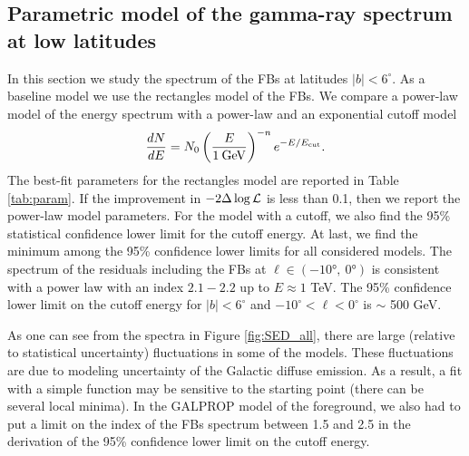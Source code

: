 \subsection{Parametric model of the gamma-ray spectrum at low latitudes}
\label{sec:param_model}

In this section we study the spectrum of the FBs at latitudes $|b| < 6^\circ$.
As a baseline model we use the rectangles model of the FBs.
We compare a power-law model of the energy spectrum with a power-law and an exponential cutoff model
\begin{equation}
\frac{dN}{dE} = N_0 \left( \frac{E}{1\:{\rm GeV}} \right)^{-n} e^{-E / E_{\rm cut}}.
\end{equation}
The best-fit parameters for the rectangles model are reported in Table \ref{tab:param}.
If the improvement in $-2 \Delta \log {\mathcal{L}}$ is less than 0.1, then we report the power-law model parameters.
For the model with a cutoff, we also find the 95\% statistical confidence lower limit for the cutoff energy.
At last, we find the minimum among the 95\% confidence lower limits for all considered models.
The spectrum of the residuals including the FBs at  $\ell \in (\ang{-10},\ \ang{0})$
is consistent with a power law with an index $2.1 - 2.2$ up to $E \approx 1$ TeV.
The 95\% confidence lower limit on the cutoff energy for $|b| < 6^\circ$ and $-10^\circ < \ell < 0^\circ$ is $\sim$ 500 GeV.

As one can see from the spectra in Figure \ref{fig:SED_all}, there are large (relative to statistical uncertainty) fluctuations in some of the models.
These fluctuations are due to modeling uncertainty of the Galactic diffuse emission.
As a result, a fit with a simple function may be sensitive to the starting point (there can be several local minima).
In the GALPROP model of the foreground, we also had to put a limit on the index of the FBs spectrum
between 1.5 and 2.5 in the derivation of the 95\% confidence lower limit on the cutoff energy.


